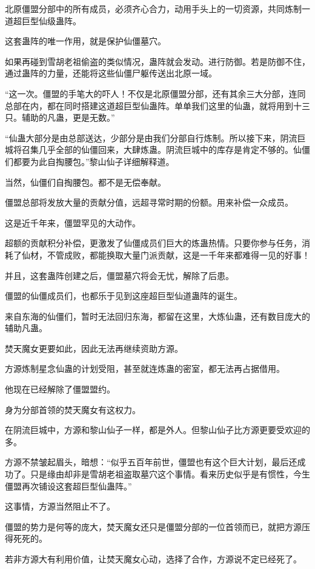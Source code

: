\begin{this_body}
北原僵盟分部中的所有成员，必须齐心合力，动用手头上的一切资源，共同炼制一道超巨型仙级蛊阵。

这套蛊阵的唯一作用，就是保护仙僵墓穴。

如果再碰到雪胡老祖偷盗的类似情况，蛊阵就会发动。进行防御。若是防御不住，通过蛊阵的力量，还能将这些仙僵尸躯传送出北原一域。

“这一次。僵盟的手笔大的吓人！不仅是北原僵盟分部，还有其余三大分部，连同总部在内，都在同时搭建这道超巨型仙蛊阵。单单我们这里的仙蛊，就将用到十三只。辅助的凡蛊，更是无数。”

“仙蛊大部分是由总部送达，少部分是由我们分部自行炼制。所以接下来，阴流巨城将召集几乎全部的仙僵回来，大肆炼蛊。阴流巨城中的库存是肯定不够的。仙僵们都要为此自掏腰包。”黎山仙子详细解释道。

当然，仙僵们自掏腰包。都不是无偿奉献。

僵盟总部将发放大量的贡献分值，远超寻常时期的份额。用来补偿一众成员。

这是近千年来，僵盟罕见的大动作。

超额的贡献积分补偿，更激发了仙僵成员们巨大的炼蛊热情。只要你参与任务，消耗了仙材，不管成败，都能换取大量门派贡献，这是一千年来都难得一见的好事！

并且，这套蛊阵创建之后，僵盟墓穴将会无忧，解除了后患。

僵盟的仙僵成员们，也都乐于见到这座超巨型仙道蛊阵的诞生。

来自东海的仙僵们，暂时无法回归东海，都留在这里，大炼仙蛊，还有数目庞大的辅助凡蛊。

焚天魔女更要如此，因此无法再继续资助方源。

方源炼制星念仙蛊的计划受阻，甚至就连炼蛊的密室，都无法再占据借用。

他现在已经解除了僵盟盟约。

身为分部首领的焚天魔女有这权力。

在阴流巨城中，方源和黎山仙子一样，都是外人。但黎山仙子比方源更要受欢迎的多。

方源不禁皱起眉头，暗想：“似乎五百年前世，僵盟也有这个巨大计划，最后还成功了。只是缘由却非是雪胡老祖盗取墓穴这个事情。看来历史似乎是有惯性，今生僵盟再次铺设这套超巨型仙蛊阵。”

这事情，方源当然阻止不了。

僵盟的势力是何等的庞大，焚天魔女还只是僵盟分部的一位首领而已，就把方源压得死死的。

若非方源大有利用价值，让焚天魔女心动，选择了合作，方源说不定已经死了。


\end{this_body}
